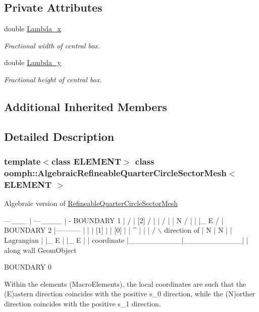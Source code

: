 \subsection*{Private Attributes}
\begin{DoxyCompactItemize}
\item 
double \hyperlink{classoomph_1_1AlgebraicRefineableQuarterCircleSectorMesh_aed38fed1e464c86e3dedd377e2459de7}{Lambda\+\_\+x}
\begin{DoxyCompactList}\small\item\em Fractional width of central box. \end{DoxyCompactList}\item 
double \hyperlink{classoomph_1_1AlgebraicRefineableQuarterCircleSectorMesh_a2690e44e43dd4ed1e45b02f4b71ae43f}{Lambda\+\_\+y}
\begin{DoxyCompactList}\small\item\em Fractional height of central box. \end{DoxyCompactList}\end{DoxyCompactItemize}
\subsection*{Additional Inherited Members}


\subsection{Detailed Description}
\subsubsection*{template$<$class E\+L\+E\+M\+E\+NT$>$\newline
class oomph\+::\+Algebraic\+Refineable\+Quarter\+Circle\+Sector\+Mesh$<$ E\+L\+E\+M\+E\+N\+T $>$}

Algebraic version of \hyperlink{classoomph_1_1RefineableQuarterCircleSectorMesh}{Refineable\+Quarter\+Circle\+Sector\+Mesh}


\begin{DoxyCode}
                     ---\_\_\_
                    |      ---\_\_\_\_
                    |              -   BOUNDARY 1
                    |               /  
                    |     [2]      /  |  
                    |             /     | 
                    | N          /        |  
                    | |\_ E      /          |    
     BOUNDARY 2     |-----------           |  
                    |          |    [1]    |
                    |   [0]    |           |  ^
                    |          |           | / \(\backslash\)  direction of
                    | N        |    N      |  |   Lagrangian 
                    | |\_ E     |    |\_ E   |  |   coordinate 
                    |\_\_\_\_\_\_\_\_\_\_|\_\_\_\_\_\_\_\_\_\_\_|  |   along wall GeomObject

                         BOUNDARY 0

Within the elements (MacroElements), the local coordinates
are such that the (E)astern direction coincides with the positive 
s\_0 direction,  \textcolor{keywordflow}{while} the (N)orther direction coincides with the positive 
s\_1 direction.
\end{DoxyCode}


